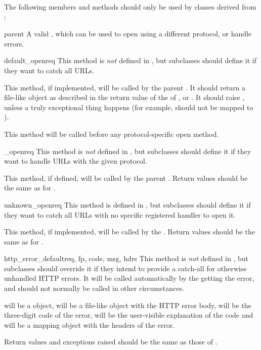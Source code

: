 The following members and methods should only be used by classes
derived from :

\begin{memberdesc}[BaseHandler]{parent}
A valid , which can be used to open using a
different protocol, or handle errors.
\end{memberdesc}

\begin{methoddesc}[BaseHandler]{default_open}{req}
This method is \emph{not} defined in , but
subclasses should define it if they want to catch all URLs.

This method, if implemented, will be called by the parent
.  It should return a file-like object as
described in the return value of the  of
, or .  It should raise
, unless a truly exceptional thing happens (for
example,  should not be mapped to
).

This method will be called before any protocol-specific open method.
\end{methoddesc}

\begin{methoddescni}[BaseHandler]{_open}{req}
This method is \emph{not} defined in , but
subclasses should define it if they want to handle URLs with the given
protocol.

This method, if defined, will be called by the parent
.  Return values should be the same as for 
.
\end{methoddescni}

\begin{methoddesc}[BaseHandler]{unknown_open}{req}
This method is  defined in , but
subclasses should define it if they want to catch all URLs with no
specific registered handler to open it.

This method, if implemented, will be called by the  
.  Return values should be the same as for 
.
\end{methoddesc}

\begin{methoddesc}[BaseHandler]{http_error_default}{req, fp, code, msg, hdrs}
This method is \emph{not} defined in , but
subclasses should override it if they intend to provide a catch-all
for otherwise unhandled HTTP errors.  It will be called automatically
by the   getting the error, and should not
normally be called in other circumstances.

 will be a  object,  will be a
file-like object with the HTTP error body,  will be the
three-digit code of the error,  will be the user-visible
explanation of the code and  will be a mapping object with
the headers of the error.

Return values and exceptions raised should be the same as those
of .
\end{methoddesc}

